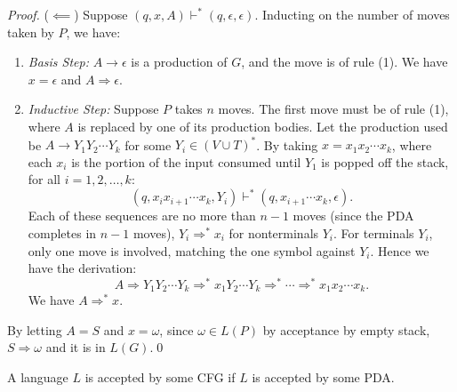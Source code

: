 \begin{proof}
  ($\impliedby$) Suppose $\left( q,x,A \right) \vdash^{*}\left(
  q,\epsilon,\epsilon \right) $. Inducting on the number of moves taken by $P$,
  we have:
  \begin{enumerate}
    \item \textit{Basis Step:} $A\to\epsilon$ is a production of $G$, and the
      move is of rule (1). We have $x=\epsilon$ and $A \Rightarrow \epsilon$.
    \item \textit{Inductive Step:} Suppose $P$ takes $n$ moves. The first move
      must be of rule (1), where $A$ is replaced by one of its production
      bodies. Let the production used be $A\to Y_1 Y_2 \cdots Y_k$ for some
      $Y_i\in \left( V\cup T \right)^{*}$. By taking $x=x_1 x_2\cdots x_k$,
      where each $x_i$ is the portion of the input consumed until $Y_1$ is
      popped off the stack, for all $i=1,2,\ldots,k$:
      \[\left( q,x_i x_{i+1}\cdots x_k,Y_i \right) \vdash^{*}\left(
      q,x_{i+1}\cdots x_k,\epsilon \right).\]
      Each of these sequences are no more than $n-1$ moves (since the PDA
      completes in $n-1$ moves), $Y_i \Rightarrow ^{*}x_i$ for nonterminals
      $Y_i$. For terminals $Y_i$, only one move is involved, matching the one
      symbol against $Y_i$. Hence we have the derivation:
      \[A \Rightarrow Y_1 Y_2\cdots Y_k \Rightarrow ^{*}x_1Y_2\cdots Y_k \Rightarrow ^{*}\cdots \Rightarrow^{*} x_1x_2\cdots x_k.\]
      We have $A \Rightarrow ^{*}x$.
  \end{enumerate}
  By letting $A=S$ and $x=\omega$, since $\omega\in L(P)$ by acceptance by empty stack,
  $S \Rightarrow \omega$ and it is in $L(G)$.\qed
\end{proof}
\begin{theorem}
  A language $L$ is accepted by some CFG if $L$ is accepted by some PDA\@.
\end{theorem}
